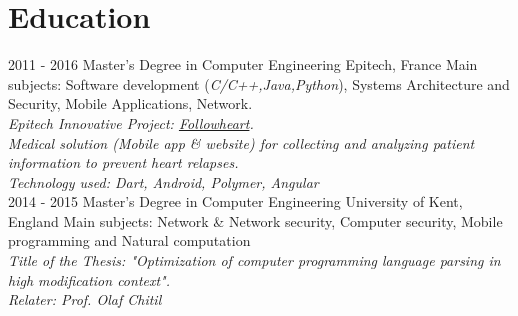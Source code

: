 \documentclass[10pt]{friggeri-cv}
\begin{document}
\section{Education}
\begin{entrylist}
  \entry
    {2011 - 2016}
    {Master's Degree in Computer Engineering}
    {Epitech, France}
    {Main subjects: Software development (\textit{C/C++,Java,Python}), Systems Architecture and Security, Mobile Applications, Network.\\
    \emph{Epitech Innovative Project: \href{http://followheart.fr}{Followheart}.}\\
    \emph{Medical solution (Mobile app \& website) for collecting and analyzing patient information to prevent heart relapses.}\\
    \emph{Technology used: Dart, Android, Polymer, Angular}\\}
  \entry
    {2014 - 2015}
    {Master's Degree in Computer Engineering}
    {University of Kent, England}
    {Main subjects: Network \& Network security, Computer security, Mobile programming and Natural computation\\
    \emph{Title of the Thesis: "Optimization of computer programming language parsing in high modification context".}\\
    \emph{Relater: Prof. Olaf Chitil}\\}

\end{entrylist}
\end{document}
